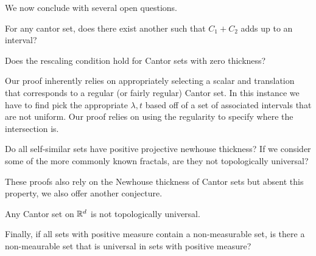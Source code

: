 We now conclude with several open questions.
\begin{conjecture}
    For any cantor set, does there exist another such that $C_1 + C_2$ adds up to an interval?
\end{conjecture}


Does the rescaling condition hold for Cantor sets with zero thickness?

Our proof inherently relies on appropriately selecting a scalar and translation that corresponds to a regular (or fairly regular) Cantor set.  In this instance we have to find pick the appropriate $\lambda, t$ based off of a set of associated intervals that are not uniform.  Our proof relies on using the regularity to specify where the intersection is. 

Do all self-similar sets have positive projective newhouse thickness?  If we consider some of the more commonly known fractals, are they not topologically universal?

These proofs also rely on the Newhouse thickness of Cantor sets but absent this property, we also offer another conjecture.  
\begin{conjecture}
    Any Cantor set on  $\mathbb{R}^d$ is not topologically universal.
\end{conjecture}


Finally, if all sets with positive measure contain a non-measurable set, is there a non-meaurable set that is universal in sets with positive measure?


%


